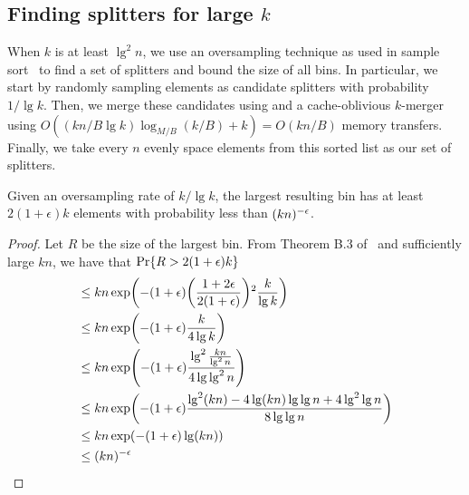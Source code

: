 \subsection*{Finding splitters for large $k$}

When $k$ is at least $\lg ^2 n$, we use an oversampling technique as used in 
sample sort~\cite{BlellochLeMa91} to find a set of splitters and bound the 
size of all bins.  In particular, we start by randomly sampling elements as 
candidate splitters with probability $1/\lg k$.  Then, we merge these candidates
using and a cache-oblivious $k$-merger~\cite{FrigoLePr99} using 
$O((kn/B\lg k) \log_{M/B} (k/B) + k) = O(kn/B)$ memory transfers.  Finally, we take
every $n$ evenly space elements from this sorted list as our set of splitters.

\begin{theorem}
  Given an oversampling rate of $k/\lg k$, the largest resulting bin has at least 
  $2(1+\epsilon)k$ elements with probability less than $\mathopen{}\left(kn\right)\mathclose{}^{-\epsilon}$.
\end{theorem}
\begin{proof}
  Let $R$ be the size of the largest bin.  
  From Theorem B.3 of~\cite{BlellochLeMa91} and sufficiently large $kn$, 
  we have that $\Pr\mathopen{}\left\{ R > 2(1+\epsilon)k \right\}\mathclose{}$
  \begin{align*}
    &\leq kn \exp \mathopen{}\left( -(1+\epsilon)\mathopen{}\left(\frac{1+2\epsilon}{2(1+\epsilon)}\right)\mathclose{}^2 \frac{k}{\lg k} \right)\mathclose{}\\
    &\leq kn \exp \mathopen{}\left(-(1+\epsilon)\frac{k}{4\lg k}\right)\mathclose{}\\
    &\leq {kn} \exp \mathopen{}\left(-(1+\epsilon)\frac{\lg^2 \frac{kn}{\lg^2 n}}{4 \lg \lg ^2 n}\right)\mathclose{}\\
    &\leq {kn} \exp \mathopen{}\left(-(1+\epsilon)\frac{\lg^2 \mathopen{}\left(kn\right)\mathclose{} - 4 \lg \mathopen{}\left(kn\right)\mathclose{} \lg \lg n + 4\lg ^2 \lg n }{8 \lg \lg n}\right)\mathclose{}\\
    &\leq {kn} \exp \mathopen{}\left(-(1+\epsilon)\lg \mathopen{}\left(kn\right)\mathclose{}\right)\mathclose{}\\
    &\leq \mathopen{}\left(kn\right)\mathclose{}^{-\epsilon}\\
  \end{align*}
\end{proof}



